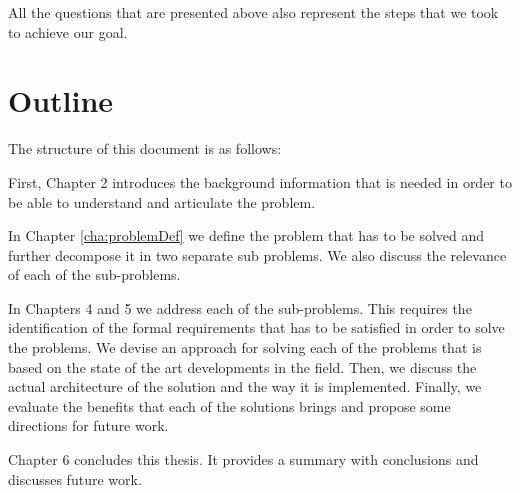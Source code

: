 All the questions that are presented above also represent the steps that we took to achieve our goal.


\section{Outline}
The structure of this document is as follows:

First, Chapter 2 introduces the background information that is needed in order to be able to understand and articulate the problem.

In Chapter \ref{cha:problemDef} we define the problem that has to be solved and further decompose it in two separate sub problems. We also discuss the relevance of each of the sub-problems.

In Chapters 4 and 5 we address each of the sub-problems. This requires the identification of the formal requirements that has to be satisfied in order to solve the problems. We devise an approach for solving each of the problems that is based on the state of the art developments in the field. Then, we discuss the actual architecture of the solution and the way it is implemented. Finally, we evaluate the benefits that each of the solutions brings and propose some directions for future work. 

Chapter 6 concludes this thesis. It provides a summary with conclusions and discusses future work.